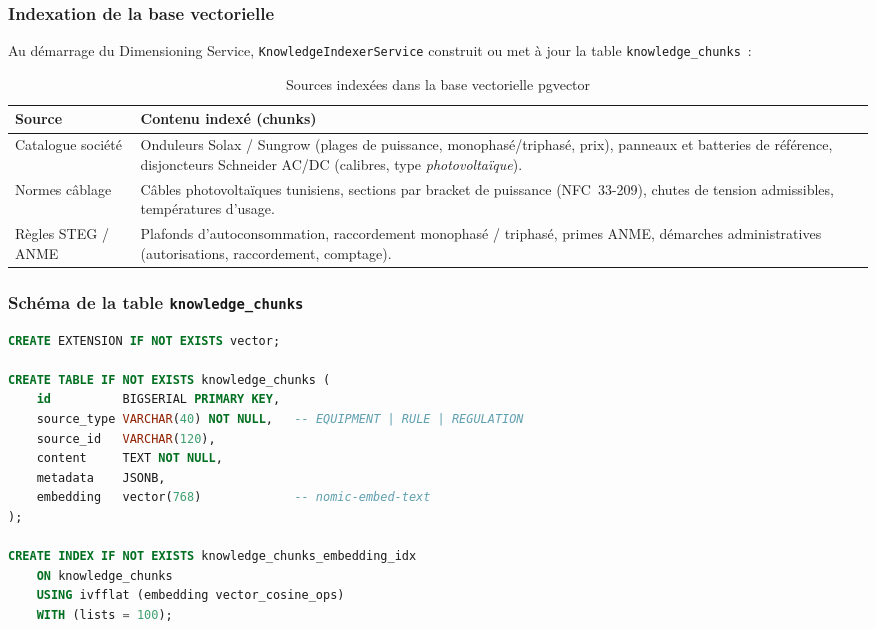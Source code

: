 \subsubsection{Indexation de la base vectorielle}

Au démarrage du Dimensioning Service, \texttt{Knowledge\-IndexerService}
construit ou met à jour la table \texttt{knowledge\_chunks}~:

\begin{table}[H]
  \caption{Sources indexées dans la base vectorielle pgvector}
  \label{tab:kb-rag}
  \centering
  \begin{tabularx}{\textwidth}{|L{3.5cm}|X|}
    \hline
    \textbf{Source} & \textbf{Contenu indexé (chunks)} \\
    \hline
    Catalogue société & Onduleurs Solax / Sungrow (plages de puissance,
      monophasé/triphasé, prix), panneaux et batteries de référence,
      disjoncteurs Schneider AC/DC (calibres, type \textit{photovoltaïque}). \\
    \hline
    Normes câblage & Câbles photovoltaïques tunisiens, sections par
      bracket de puissance (NFC~33-209), chutes de tension admissibles,
      températures d'usage. \\
    \hline
    Règles STEG / ANME & Plafonds d'autoconsommation, raccordement
      monophasé / triphasé, primes ANME, démarches administratives
      (autorisations, raccordement, comptage). \\
    \hline
  \end{tabularx}
\end{table}

\subsubsection{Schéma de la table \texttt{knowledge\_chunks}}

\begin{lstlisting}[caption={Schéma pgvector --- knowledge\_chunks},
                   label=lst:pgvector, language=SQL]
CREATE EXTENSION IF NOT EXISTS vector;

CREATE TABLE IF NOT EXISTS knowledge_chunks (
    id          BIGSERIAL PRIMARY KEY,
    source_type VARCHAR(40) NOT NULL,   -- EQUIPMENT | RULE | REGULATION
    source_id   VARCHAR(120),
    content     TEXT NOT NULL,
    metadata    JSONB,
    embedding   vector(768)             -- nomic-embed-text
);

CREATE INDEX IF NOT EXISTS knowledge_chunks_embedding_idx
    ON knowledge_chunks
    USING ivfflat (embedding vector_cosine_ops)
    WITH (lists = 100);
\end{lstlisting}

